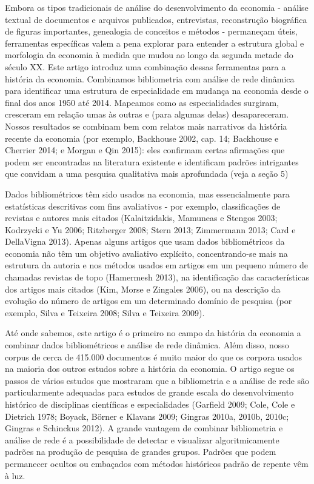\documentclass[12pt]{article}
\begin{document}
Embora os tipos tradicionais de análise do desenvolvimento da economia - análise textual de documentos e arquivos publicados, entrevistas, reconstrução biográfica de figuras importantes, genealogia de conceitos e métodos - permaneçam úteis, ferramentas específicas valem a pena explorar para entender a estrutura global e morfologia da economia à medida que mudou ao longo da segunda metade do século XX. Este artigo introduz uma combinação dessas ferramentas para a história da economia. Combinamos bibliometria com análise de rede dinâmica para identificar uma estrutura de especialidade em mudança na economia desde o final dos anos 1950 até 2014. Mapeamos como as especialidades surgiram, cresceram em relação umas às outras e (para algumas delas) desapareceram. Nossos resultados se combinam bem com relatos mais narrativos da história recente da economia (por exemplo, Backhouse 2002, cap. 14; Backhouse e Cherrier 2014; e Morgan e Qin 2015): eles confirmam certas afirmações que podem ser encontradas na literatura existente e identificam padrões intrigantes que convidam a uma pesquisa qualitativa mais aprofundada (veja a seção 5)

Dados bibliométricos têm sido usados na economia, mas essencialmente para estatísticas descritivas com fins avaliativos - por exemplo, classificações de revistas e autores mais citados (Kalaitzidakis, Mamuneas e Stengos 2003; Kodrzycki e Yu 2006; Ritzberger 2008; Stern 2013; Zimmermann 2013; Card e DellaVigna 2013). Apenas alguns artigos que usam dados bibliométricos da economia não têm um objetivo avaliativo explícito, concentrando-se mais na estrutura da autoria e nos métodos usados em artigos em um pequeno número de chamadas revistas de topo (Hamermesh 2013), na identificação das características dos artigos mais citados (Kim, Morse e Zingales 2006), ou na descrição da evolução do número de artigos em um determinado domínio de pesquisa (por exemplo, Silva e Teixeira 2008; Silva e Teixeira 2009).

Até onde sabemos, este artigo é o primeiro no campo da história da economia a combinar dados bibliométricos e análise de rede dinâmica. Além disso, nosso corpus de cerca de 415.000 documentos é muito maior do que os corpora usados na maioria dos outros estudos sobre a história da economia. O artigo segue os passos de vários estudos que mostraram que a bibliometria e a análise de rede são particularmente adequadas para estudos de grande escala do desenvolvimento histórico de disciplinas científicas e especialidades (Garfield 2009; Cole, Cole e Dietrich 1978; Boyack, Börner e Klavans 2009; Gingras 2010a, 2010b, 2010c; Gingras e Schinckus 2012). A grande vantagem de combinar bibliometria e análise de rede é a possibilidade de detectar e visualizar algoritmicamente padrões na produção de pesquisa de grandes grupos. Padrões que podem permanecer ocultos ou embaçados com métodos históricos padrão de repente vêm à luz.
\end{document}
